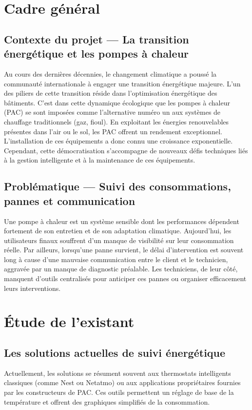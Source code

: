 \documentclass[12pt,a4paper]{report}
\begin{document}
\section{Cadre général}
\subsection{Contexte du projet — La transition énergétique et les pompes à chaleur}
Au cours des dernières décennies, le changement climatique a poussé la communauté internationale à engager une transition énergétique majeure. L'un des piliers de cette transition réside dans l'optimisation énergétique des bâtiments. C’est dans cette dynamique écologique que les pompes à chaleur (PAC) se sont imposées comme l'alternative numéro un aux systèmes de chauffage traditionnels (gaz, fioul). En exploitant les énergies renouvelables présentes dans l'air ou le sol, les PAC offrent un rendement exceptionnel. L'installation de ces équipements a donc connu une croissance exponentielle. Cependant, cette démocratisation s'accompagne de nouveaux défis techniques liés à la gestion intelligente et à la maintenance de ces équipements.

\subsection{Problématique — Suivi des consommations, pannes et communication}
Une pompe à chaleur est un système sensible dont les performances dépendent fortement de son entretien et de son adaptation climatique. Aujourd'hui, les utilisateurs finaux souffrent d'un manque de visibilité sur leur consommation réelle. Par ailleurs, lorsqu'une panne survient, le délai d'intervention est souvent long à cause d'une mauvaise communication entre le client et le technicien, aggravée par un manque de diagnostic préalable. Les techniciens, de leur côté, manquent d'outils centralisés pour anticiper ces pannes ou organiser efficacement leurs interventions.

\section{Étude de l'existant}
\subsection{Les solutions actuelles de suivi énergétique}
Actuellement, les solutions se résument souvent aux thermostats intelligents classiques (comme Nest ou Netatmo) ou aux applications propriétaires fournies par les constructeurs de PAC. Ces outils permettent un réglage de base de la température et offrent des graphiques simplifiés de la consommation.
\end{document}
